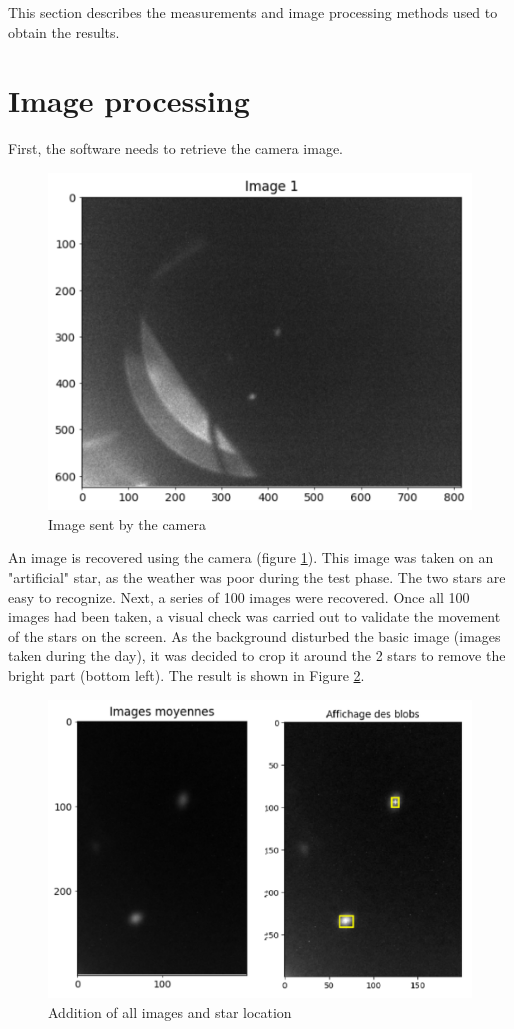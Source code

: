 This section describes the measurements and image processing methods used to obtain the results.
\section{Image processing}\label{sec:MES_TIS}
First, the software needs to retrieve the camera image.
\begin{figure}[H]
    \centering
    \includegraphics[scale=0.75]{assets/figures/MesuresResultats/ImageSimple.png}
    \caption{Image sent by the camera}
    \label{fig:MES_Ima1}
\end{figure}
An image is recovered using the camera (figure \ref{fig:MES_Ima1}). This image was taken on an "artificial" star, as the weather
was poor during the test phase. The two stars are easy to recognize.
\newpage
Next, a series of 100 images were recovered.
Once all 100 images had been taken, a visual check was carried out to validate the movement of the stars on the screen.
As the background disturbed the basic image (images taken during the day), it was decided to crop it around the
2 stars to remove the bright part (bottom left). The result is shown in Figure \ref{fig:MES_ImaMoy}.
\begin{figure}[H]
    \centering
    \includegraphics[scale=0.95]{assets/figures/MesuresResultats/ImageMoyenne.png}
    \caption{Addition of all images and star location}
    \label{fig:MES_ImaMoy}
\end{figure}
